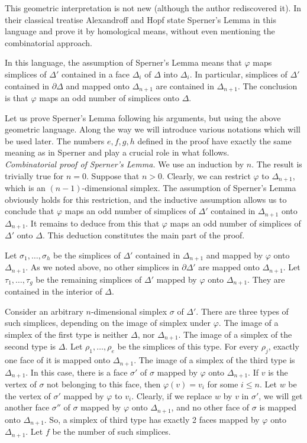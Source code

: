 \documentclass[leqno, 11pt]{article}\usepackage{latexsym}\usepackage{amsmath, amscd}\usepackage{amssymb}
\begin{document}
This geometric interpretation is not new (although the author rediscovered it). In their classical treatise \cite{AH} Alexandroff and Hopf state Sperner's Lemma in this language and prove it by homological means, without even mentioning the combinatorial approach.

In this language, the assumption of Sperner's Lemma means that $\varphi$ maps simplices of $\Delta'$ contained in a face $\Delta_i$ of $\Delta$ into $\Delta_i$. In particular, simplices of $\Delta'$ contained in $\partial\Delta$ and mapped onto $\Delta_{n+1}$ are contained in $\Delta_{n+1}$. The conclusion is that $\varphi$ maps an odd number of simplices onto $\Delta$.

Let us prove Sperner's Lemma following his arguments, but using the above geometric language. Along the way we will introduce various notations which will be used later. The numbers $e,f,g,h$ defined in the proof have exactly the same meaning as in Sperner \cite{S} and play a crucial role in what follows.\\

\noindent
{\em Combinatorial proof of Sperner's Lemma.} We use an induction by $n$. The result is trivially true for $n=0$. Suppose that $n>0$. 
Clearly, we can restrict $\varphi$ to $\Delta_{n+1}$, which is an $(n-1)$-dimensional simplex. 
The assumption of Sperner's Lemma obviously holds for this restriction, 
and the inductive assumption allows us to conclude that $\varphi$ maps an odd number of simplices of $\Delta'$ contained in 
$\Delta_{n+1}$ onto $\Delta_{n+1}$. It remains to deduce from this that $\varphi$ maps an odd number of simplices of $\Delta'$ onto $\Delta$. 
This deduction constitutes the main part of the proof.

Let $\sigma_1,\ldots,\sigma_h$ be the simplices of $\Delta'$ contained in $\Delta_{n+1}$ and mapped by $\varphi$ onto $\Delta_{n+1}$. As we noted above, no other simplices in $\partial\Delta'$ are mapped onto $\Delta_{n+1}$. Let $\tau_1,\ldots,\tau_g$ be the remaining simplices of $\Delta'$ mapped by $\varphi$ onto $\Delta_{n+1}$. 
They are contained in the interior of $\Delta$.

Consider an arbitrary $n$-dimensional simplex $\sigma$ of $\Delta'$. There are three types of such simplices, depending on the image of simplex under $\varphi$. 
The image of a simplex of the first type is neither $\Delta$, nor $\Delta_{n+1}$. The image of a simplex of the second type is $\Delta$. 
Let $\rho_1,\ldots,\rho_e$ be the simplices of this type. For every $\rho_j$, exactly one face of it is mapped onto $\Delta_{n+1}$. 
The image of a simplex of the third type is $\Delta_{n+1}$. In this case, there is a face $\sigma'$ of $\sigma$ mapped by $\varphi$ onto $\Delta_{n+1}$. 
If $v$ is the vertex of $\sigma$ not belonging to this face, then $\varphi(v)=v_i$ for some $i\leqslant n$. 
Let $w$ be the vertex of $\sigma'$ mapped by $\varphi$ to $v_i$. Clearly, if we replace $w$ by $v$ in $\sigma'$, 
we will get another face $\sigma''$ of $\sigma$ mapped by $\varphi$ onto $\Delta_{n+1}$,
and no other face of $\sigma$ is mapped onto $\Delta_{n+1}$. So, a simplex of third type 
has exactly 2 faces mapped by $\varphi$ onto $\Delta_{n+1}$. Let $f$ be the number of such simplices.
\end{document}
